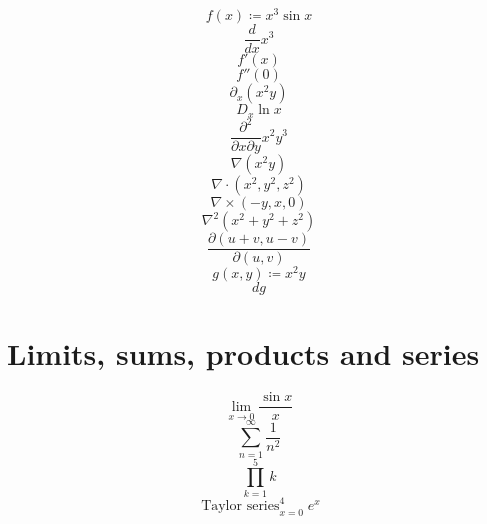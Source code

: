 \documentclass[11pt,a4paper]{article}
\theoremstyle{plain}
\theoremstyle{definition}
\theoremstyle{remark}
\begin{document}
\begin{equation*}
  f(x) \coloneqq  x^3 \sin x
\end{equation*}
\begin{equation*}
  \frac{d}{dx} x^3
\end{equation*}
\begin{equation*}
  f'(x)
\end{equation*}
\begin{equation*}
  f''(0)
\end{equation*}
\begin{equation*}
  \partial_x (x^2 y)
\end{equation*}
\begin{equation*}
  D_x \ln x
\end{equation*}
\begin{equation*}
  \frac{\partial^2}{\partial x \partial y} x^2 y^3
\end{equation*}
\begin{equation*}
  \nabla (x^2 y)
\end{equation*}
\begin{equation*}
  \nabla \cdot (x^2, y^2, z^2)
\end{equation*}
\begin{equation*}
  \nabla \times (-y, x, 0)
\end{equation*}
\begin{equation*}
  \nabla^2 (x^2 + y^2 + z^2)
\end{equation*}
\begin{equation*}
  \frac{\partial(u + v, u - v)}{\partial(u, v)}
\end{equation*}
\begin{equation*}
  g(x, y) \coloneqq  x^2 y
\end{equation*}
\begin{equation*}
  dg
\end{equation*}
\section*{Limits, sums, products and series}

\begin{equation*}
  \lim_{x \to 0} \frac{\sin x}{x}
\end{equation*}
\begin{equation*}
  \sum_{n=1}^{\infty} \frac{1}{n^2}
\end{equation*}
\begin{equation*}
  \prod_{k=1}^{5} k
\end{equation*}
\begin{equation*}
  \operatorname{Taylor\ series}_{x=0}^{4} e^x
\end{equation*}
\end{document}
